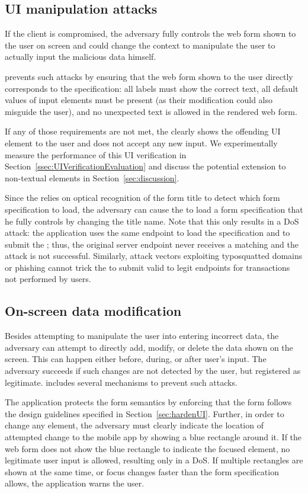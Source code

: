 \subsection{UI manipulation attacks}

If the client is compromised, the adversary fully controls the web form shown to the user on screen and could change the context to manipulate the user to actually input the malicious data himself.

\name prevents such attacks by ensuring that the web form shown to the user directly corresponds to the specification: all labels must show the correct text, all default values of input elements must be present (as their modification could also misguide the user), and no unexpected text is allowed in the rendered web form.

If any of those requirements are not met, the \app clearly shows the offending UI element to the user and does not accept any new input.
We experimentally measure the performance of this UI verification in Section~\ref{ssec:UIVerificationEvaluation} and discuss the potential extension to non-textual elements in Section~\ref{sec:discussion}.


Since the \app relies on optical recognition of the form title to detect which form specification to load, the adversary can cause the \app to load a form specification that he fully controls by changing the title name.
Note that this only results in a DoS attack: the application uses the same endpoint to load the specification and to submit the \POI; thus, the original server endpoint never receives a matching \POI and the attack is not successful.
Similarly, attack vectors exploiting typosquatted domains or phishing cannot trick the \app to submit valid \PsOI to legit endpoints for transactions not performed by users.


\subsection{On-screen data modification}
Besides attempting to manipulate the user into entering incorrect data, the adversary can attempt to directly add, modify, or delete the data shown on the screen. This can happen either before, during, or after user's input. 
The adversary succeeds if such changes are not detected by the user, but registered as legitimate.
\sysname includes several mechanisms to prevent such attacks.


The application protects the form semantics by enforcing that the form follows the design guidelines specified in Section~\ref{sec:hardenUI}.
Further, in order to change any element, the adversary must clearly indicate the location of attempted change to the mobile app by showing a blue rectangle around it.
If the web form does not show the blue rectangle to indicate the focused element, no legitimate user input is allowed, resulting only in a DoS.
If multiple rectangles are shown at the same time, or focus changes faster than the form specification allows, the application warns the user.

